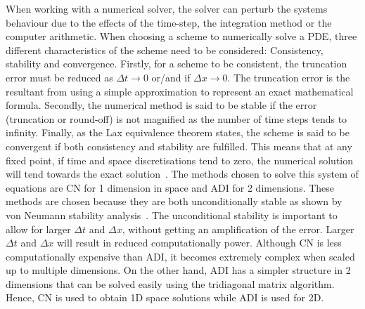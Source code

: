 When working with a numerical solver, the solver can perturb the systems behaviour due to the effects of the time-step, the integration method or the computer arithmetic.
When choosing a scheme to numerically solve a PDE, three different characteristics of the scheme need to be considered: Consistency, stability and convergence.
Firstly, for a scheme to be consistent, the truncation error must be reduced as $\Delta t \rightarrow 0$ or/and if $\Delta x \rightarrow 0$.
The truncation error is the resultant from using a simple approximation to represent an exact mathematical formula.
Secondly, the numerical method is said to be stable if the error (truncation or round-off) is not magnified as the number of time steps tends to infinity.
Finally, as the Lax equivalence theorem states, the scheme is said to be convergent if both consistency and stability are fulfilled.
This means that at any fixed point, if time and space discretisations tend to zero, the numerical solution will tend towards the exact solution~\parencite{smith1985numerical}.
The methods chosen to solve this system of equations are \acrfull{CN} for 1 dimension in space and \acrfull{ADI} for 2 dimensions. These methods are chosen because they are both unconditionally stable as shown by von Neumann stability analysis~\parencite{strikwerda2004finite}. The unconditional stability is important to allow for larger $\Delta t$ and $\Delta x$, without getting an amplification of the error. Larger $\Delta t$ and $\Delta x$ will result in reduced computationally power. Although \acrshort{CN} is less computationally expensive than \acrshort{ADI}, it becomes extremely complex when scaled up to multiple dimensions. On the other hand, \acrshort{ADI} has a simpler structure in 2 dimensions that can be solved easily using the tridiagonal matrix algorithm. Hence, \acrshort{CN} is used to obtain 1D space solutions while \acrshort{ADI} is used for 2D.
